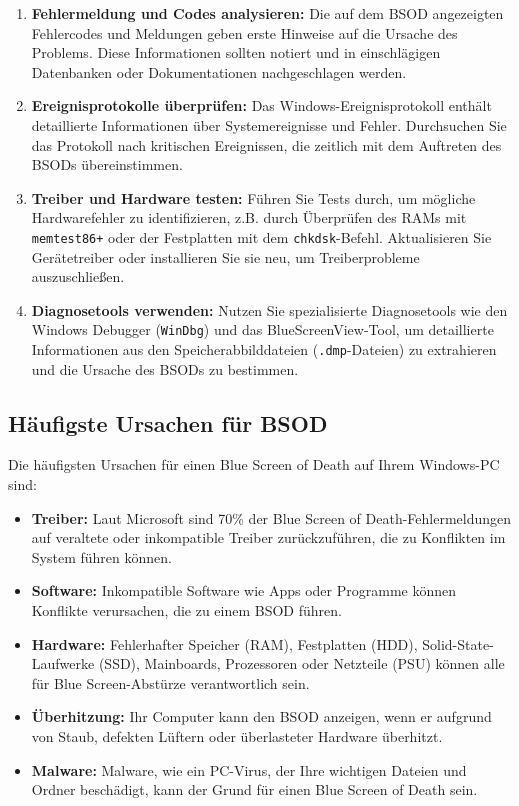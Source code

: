 \documentclass[paper=a4,fontsize=12pt,ngerman,parskip=half]{scrartcl}
\begin{document}
\begin{enumerate}
  \item \textbf{Fehlermeldung und Codes analysieren:} Die auf dem BSOD angezeigten Fehlercodes und Meldungen geben erste Hinweise auf die Ursache des Problems. Diese Informationen sollten notiert und in einschlägigen Datenbanken oder Dokumentationen nachgeschlagen werden.
  \item \textbf{Ereignisprotokolle überprüfen:} Das Windows-Ereignisprotokoll enthält detaillierte Informationen über Systemereignisse und Fehler. Durchsuchen Sie das Protokoll nach kritischen Ereignissen, die zeitlich mit dem Auftreten des BSODs übereinstimmen.\cite{wikipedia}
  \item \textbf{Treiber und Hardware testen:} Führen Sie Tests durch, um mögliche Hardwarefehler zu identifizieren, z.B. durch Überprüfen des RAMs mit \texttt{memtest86+} oder der Festplatten mit dem \texttt{chkdsk}-Befehl. Aktualisieren Sie Gerätetreiber oder installieren Sie sie neu, um Treiberprobleme auszuschließen.
  \item \textbf{Diagnosetools verwenden:} Nutzen Sie spezialisierte Diagnosetools wie den Windows Debugger (\texttt{WinDbg}) und das BlueScreenView-Tool, um detaillierte Informationen aus den Speicherabbilddateien (\texttt{.dmp}-Dateien) zu extrahieren und die Ursache des BSODs zu bestimmen.\cite{microsoft_support}
\end{enumerate}

\subsection{Häufigste Ursachen für BSOD}

Die häufigsten Ursachen für einen Blue Screen of Death auf Ihrem Windows-PC sind:

\begin{itemize}
  \item \textbf{Treiber:} Laut Microsoft sind 70\% der Blue Screen of Death-Fehlermeldungen auf veraltete oder inkompatible Treiber zurückzuführen, die zu Konflikten im System führen können.\cite{microsoft_support}
  \item \textbf{Software:} Inkompatible Software wie Apps oder Programme können Konflikte verursachen, die zu einem BSOD führen.\cite{malwarebytes}
  \item \textbf{Hardware:} Fehlerhafter Speicher (RAM), Festplatten (HDD), Solid-State-Laufwerke (SSD), Mainboards, Prozessoren oder Netzteile (PSU) können alle für Blue Screen-Abstürze verantwortlich sein.\cite{microsoft_forum}
  \item \textbf{Überhitzung:} Ihr Computer kann den BSOD anzeigen, wenn er aufgrund von Staub, defekten Lüftern oder überlasteter Hardware überhitzt.\cite{avast}
  \item \textbf{Malware:} Malware, wie ein PC-Virus, der Ihre wichtigen Dateien und Ordner beschädigt, kann der Grund für einen Blue Screen of Death sein.\cite{malwarebytes}
\end{itemize}
\end{document}
